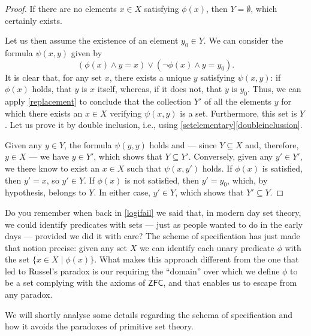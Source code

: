 \begin{proof}
If there are no elements $x\in X$ satisfying $\phi(x)$, then $Y = \emptyset$, which certainly exists.

Let us then assume the existence of an element $y_0 \in Y$. We can consider the formula $\psi(x,y)$ given by
\[ (\phi(x) \land y = x) \lor (\lnot \phi(x) \land y = y_0).\]
It is clear that, for any set $x$, there exists a unique $y$ satisfying $\psi(x,y)$: if $\phi(x)$ holds, that $y$ is $x$ itself, whereas, if it does not, that $y$ is $y_0$.
Thus, we can apply \ref{replacement} to conclude that the collection $Y'$ of all the elements $y$ for which there exists an $x\in X$ verifying $\psi(x,y)$ is a set. Furthermore, this set is $Y$. Let us prove it by double inclusion, i.e., using \ref{setelementary}\ref{doubleinclussion}.

Given any $y\in Y$, the formula $\psi(y,y)$ holds and --- since $Y\subseteq X$ and, therefore, $y\in X$ --- we have $y \in Y'$, which shows that $Y\subseteq Y'$.
Conversely, given any $y'\in Y'$, we there know to exist an $x\in X$ such that $\psi(x,y')$ holds.
If $\phi(x)$ is satisfied, then $y'=x$, so $y'\in Y$.
If $\phi(x)$ is not satisfied, then $y' = y_0$, which, by hypothesis, belongs to $Y$.
In either case, $y'\in Y$, which shows that $Y'\subseteq Y$.
\end{proof}

\begin{para}
Do you remember when back in \ref{logifail} we said that, in modern day set theory, we could identify predicates with sets --- just as people wanted to do in the early days --- provided we did it with care?
The scheme of specification has just made that notion precise: given any set $X$ we can identify each unary predicate $\phi$ with the set $\{x \in X \mid \phi(x)\}$.
What makes this approach different from the one that led to Russel's paradox is our requiring the ``domain'' over which we define $\phi$ to be a set complying with the axioms of $\mathsf{ZFC}$, and that enables us to escape from any paradox.

We will shortly analyse some details regarding the schema of specification  and how it avoids the paradoxes of primitive set theory.
\end{para}

